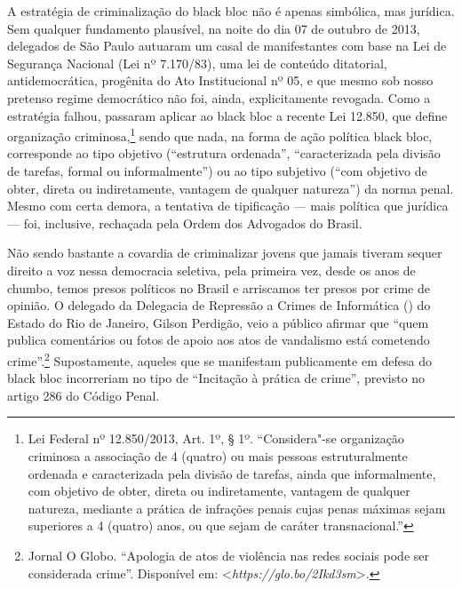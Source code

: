 A estratégia de criminalização do black bloc não é apenas simbólica, mas
jurídica. Sem qualquer fundamento plausível, na noite do dia 07 de
outubro de 2013, delegados de São Paulo autuaram um casal de
manifestantes com base na Lei de Segurança Nacional (Lei nº 7.170/83),
uma lei de conteúdo ditatorial, antidemocrática, progênita do Ato
Institucional nº 05, e que mesmo sob nosso pretenso regime democrático
não foi, ainda, explicitamente revogada. Como a estratégia falhou,
passaram aplicar ao black bloc a recente Lei 12.850, que define
organização criminosa,\footnote{Lei Federal nº
  12.850/2013, Art. 1º, § 1º. ``Considera"-se organização criminosa a
  associação de 4 (quatro) ou mais pessoas estruturalmente ordenada e
  caracterizada pela divisão de tarefas, ainda que informalmente, com
  objetivo de obter, direta ou indiretamente, vantagem de qualquer
  natureza, mediante a prática de infrações penais cujas penas máximas
  sejam superiores a 4 (quatro) anos, ou que sejam de caráter
  transnacional.''} sendo que nada, na forma de ação política black
bloc, corresponde ao tipo objetivo (``estrutura ordenada'',
``caracterizada pela divisão de tarefas, formal ou informalmente'') ou
ao tipo subjetivo (``com objetivo de obter, direta ou indiretamente,
vantagem de qualquer natureza'') da norma penal. Mesmo com certa demora,
a tentativa de tipificação --- mais política que jurídica --- foi,
inclusive, rechaçada pela Ordem dos Advogados do Brasil.

Não sendo bastante a covardia de criminalizar jovens que jamais tiveram
sequer direito a voz nessa democracia seletiva, pela primeira vez, desde
os anos de chumbo, temos presos políticos no Brasil e arriscamos ter
presos por crime de opinião. O delegado da Delegacia de Repressão a
Crimes de Informática () do Estado do Rio de Janeiro, Gilson
Perdigão, veio a público afirmar que ``quem publica comentários ou fotos
de apoio aos atos de vandalismo está cometendo
crime''.\footnote{Jornal O Globo.
  ``Apologia de atos de violência nas redes sociais pode ser considerada
  crime''. Disponível em:
  \textless{}\emph{https://glo.bo/2Ikd3sm}\textgreater{}.}
Supostamente, aqueles que se manifestam publicamente em defesa do black
bloc incorreriam no tipo de ``Incitação à prática de crime'', previsto
no artigo 286 do Código Penal.

